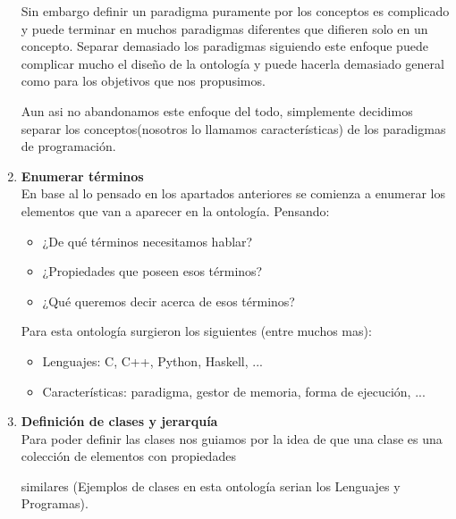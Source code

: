 \documentclass[12pt, titlepage, a4paper]{article}
\begin{document}
\begin{enumerate}
{           Sin embargo definir un paradigma puramente por los conceptos es complicado y puede terminar en muchos
           paradigmas diferentes que difieren solo en un concepto. Separar demasiado los paradigmas siguiendo este enfoque 
           puede complicar mucho el diseño de la ontología y puede hacerla demasiado general como para los objetivos que nos propusimos.

           Aun asi no abandonamos este enfoque del todo, simplemente decidimos separar los conceptos(nosotros lo llamamos
           características) de los paradigmas de programación.
           }
    \item {\textbf{Enumerar términos}\\
           En base al lo pensado en los apartados anteriores se comienza a 
           enumerar los elementos que van a aparecer en la ontología.
           Pensando:
           \begin{itemize}
            \item {¿De qué términos necesitamos hablar?}
            \item {¿Propiedades que poseen esos términos?}
            \item {¿Qué queremos decir acerca de esos términos?} 
           \end{itemize}
           Para esta ontología surgieron los siguientes (entre muchos mas):
           \begin{itemize}
            \item {Lenguajes: C, C++, Python, Haskell, ...}
            \item {Características: paradigma, gestor de memoria, forma de ejecución, ...}
           \end{itemize}}
    \item {\textbf{Definición de clases y jerarquía}\\
           Para poder definir las clases nos guiamos por la idea de que 
           una clase es una colección de elementos con propiedades 

           similares (Ejemplos de clases en esta ontología serian los 
           Lenguajes y Programas).\\

}
\end{enumerate}
\end{document}
